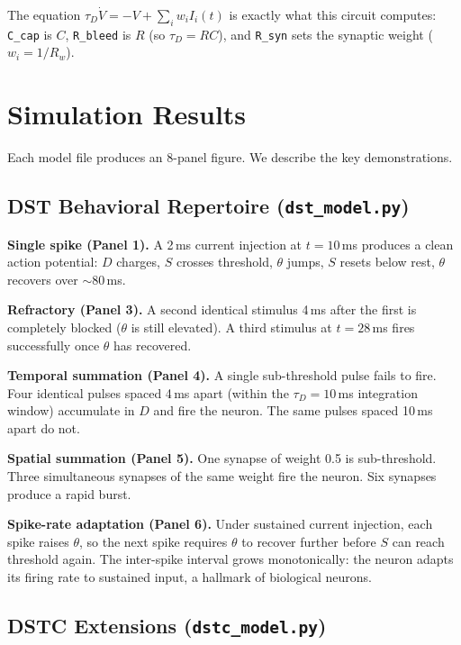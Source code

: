 \documentclass[12pt]{article}
\begin{document}
\noindent The equation $\tau_D \dot{V} = -V + \sum_i w_i I_i(t)$ is exactly what this circuit computes: \texttt{C\_cap} is $C$, \texttt{R\_bleed} is $R$ (so $\tau_D = RC$), and \texttt{R\_syn} sets the synaptic weight ($w_i = 1/R_w$).

\section{Simulation Results}
\label{sec:results}

Each model file produces an 8-panel figure. We describe the key demonstrations.

\subsection{DST Behavioral Repertoire (\texttt{dst\_model.py})}

\textbf{Single spike (Panel 1).} A 2\,ms current injection at $t = 10$\,ms produces a clean action potential: $D$ charges, $S$ crosses threshold, $\theta$ jumps, $S$ resets below rest, $\theta$ recovers over $\sim$80\,ms.

\textbf{Refractory (Panel 3).} A second identical stimulus 4\,ms after the first is completely blocked ($\theta$ is still elevated). A third stimulus at $t = 28$\,ms fires successfully once $\theta$ has recovered.

\textbf{Temporal summation (Panel 4).} A single sub-threshold pulse fails to fire. Four identical pulses spaced 4\,ms apart (within the $\tau_D = 10$\,ms integration window) accumulate in $D$ and fire the neuron. The same pulses spaced 10\,ms apart do not.

\textbf{Spatial summation (Panel 5).} One synapse of weight 0.5 is sub-threshold. Three simultaneous synapses of the same weight fire the neuron. Six synapses produce a rapid burst.

\textbf{Spike-rate adaptation (Panel 6).} Under sustained current injection, each spike raises $\theta$, so the next spike requires $\theta$ to recover further before $S$ can reach threshold again. The inter-spike interval grows monotonically: the neuron adapts its firing rate to sustained input, a hallmark of biological neurons.

\subsection{DSTC Extensions (\texttt{dstc\_model.py})}
\end{document}
